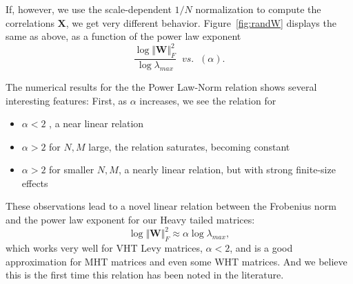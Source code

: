 If, however, we use the scale-dependent $1/N$ normalization to compute the correlations $\mathbf{X}$, we get very different behavior.
Figure~\ref{fig:randW} displays the same as above, as a function of the power law exponent 
$$
\dfrac{\log\Vert\mathbf{W}\Vert^{2}_{F}}{\log\lambda_{max}}\;\;vs.\;\;(\alpha)  .
$$


The numerical results for the the Power Law-Norm relation shows several interesting features: 
First, as $\alpha$ increases, we see the relation for
\begin{itemize}
\item  $\alpha<2$ , a near linear relation 
\item  $\alpha>2$ for $N,M$ large, the relation saturates, becoming constant
\item  $\alpha>2$  for smaller $N,M$,  a nearly linear relation, but with strong finite-size effects
\end{itemize}
These observations lead to a novel linear relation between the Frobenius norm and the power law exponent for our Heavy tailed matrices:
$$
\log\Vert\mathbf{W}\Vert^{2}_{F}\approx\alpha\log\lambda_{max}  ,
$$
which works very well for VHT Levy matrices, $\alpha<2$, and is a good approximation for MHT matrices and even some WHT matrices. 
And we believe this is the first time this relation has been noted in the literature.


